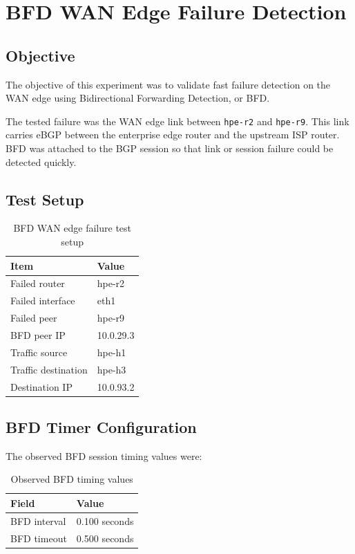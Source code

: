 \section{BFD WAN Edge Failure Detection}

\subsection{Objective}

The objective of this experiment was to validate fast failure detection on the WAN edge using Bidirectional Forwarding Detection, or BFD.

The tested failure was the WAN edge link between \texttt{hpe-r2} and \texttt{hpe-r9}. This link carries eBGP between the enterprise edge router and the upstream ISP router. BFD was attached to the BGP session so that link or session failure could be detected quickly.

\subsection{Test Setup}

\begin{table}[h]
\centering
\begin{tabular}{|l|l|}
\hline
\textbf{Item} & \textbf{Value} \\
\hline
Failed router & hpe-r2 \\
\hline
Failed interface & eth1 \\
\hline
Failed peer & hpe-r9 \\
\hline
BFD peer IP & 10.0.29.3 \\
\hline
Traffic source & hpe-h1 \\
\hline
Traffic destination & hpe-h3 \\
\hline
Destination IP & 10.0.93.2 \\
\hline
\end{tabular}
\caption{BFD WAN edge failure test setup}
\end{table}

\subsection{BFD Timer Configuration}

The observed BFD session timing values were:

\begin{table}[h]
\centering
\begin{tabular}{|l|l|}
\hline
\textbf{Field} & \textbf{Value} \\
\hline
BFD interval & 0.100 seconds \\
\hline
BFD timeout & 0.500 seconds \\
\hline
\end{tabular}
\caption{Observed BFD timing values}
\end{table}

